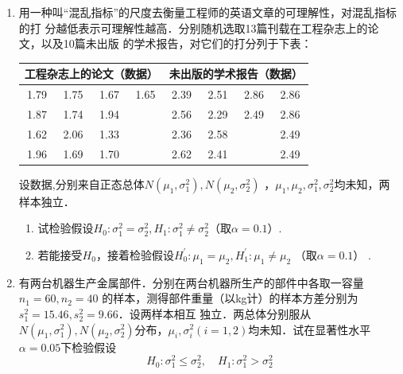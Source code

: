 \begin{enumerate}
    \item 用一种叫“混乱指标”的尺度去衡量工程师的英语文章的可理解性，对混乱指标的打
    分越低表示可理解性越高．分别随机选取13篇刊载在工程杂志上的论文，以及10篇未出版
    的学术报告，对它们的打分列于下表：
    \renewcommand{\arraystretch}{1.3} 
    \begin{table}[H]\centering
    \begin{tabular}{cccc|cccc}
        \hline
        \multicolumn{4}{c|}{工程杂志上的论文（数据\uppercase\expandafter{\romannumeral1}）} & \multicolumn{4}{c}{未出版的学术报告（数据\uppercase\expandafter{\romannumeral2}）}         \\ \hline
        1.79   & 1.75   & 1.67   & 1.65   & 2.39      & 2.51      & 2.86     & {\color[HTML]{FFFFFF} 2.86} \\
        1.87   & 1.74   & 1.94   &        & 2.56      & 2.29      & 2.49     & {\color[HTML]{FFFFFF} 2.86} \\
        1.62   & 2.06   & 1.33   &        & 2.36      & 2.58      &          & {\color[HTML]{FFFFFF} 2.49} \\
        1.96   & 1.69   & 1.70   &        & 2.62      & 2.41      &          & {\color[HTML]{FFFFFF} 2.49} \\ \hline
    \end{tabular}
    \end{table}
    \renewcommand{\arraystretch}{1.0} 
    设数据\uppercase\expandafter{},\uppercase\expandafter{}分别来自正态总体$N(\mu_1,\sigma_1^2),N(\mu_2,\sigma_2^2)$
    ，$\mu_1,\mu_2,\sigma_1^2,\sigma_2^2$均未知，两样本独立．
    \begin{enumerate}
        \item 试检验假设$H_0:\sigma_1^2=\sigma_2^2,H_1:\sigma_1^2\neq \sigma_2^2$（取$\alpha=0.1$）.
        \item 若能接受$H_0$，接着检验假设$H^\prime_0:\mu_1=\mu_2,H^\prime_1:\mu_1\neq \mu_2$ （取$\alpha=0.1$） .
    \end{enumerate}




    \item 有两台机器生产金属部件．分别在两台机器所生产的部件中各取一容量$n_1=60,n_2=40$
    的样本，测得部件重量（以kg计）的样本方差分别为$s_1^2=15.46,s_2^2=9.66$．设两样本相互
    独立．两总体分别服从$N(\mu_1,\sigma_1^2),N(\mu_2,\sigma_2^2)$分布，$\mu_i,\sigma_i^2(i=1,2)$均未知．试在显著性水平
    $\alpha=0.05$下检验假设
    $$H_0:\sigma_1^2\leq \sigma_2^2,\quad H_1:\sigma_1^2>\sigma_2^2$$





\end{enumerate}
